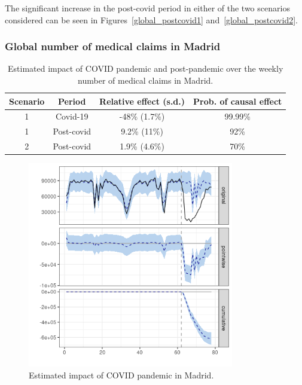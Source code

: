 \documentclass[9pt]{osa-supplemental-document}
\begin{document}
The significant increase in the post-covid period in either of the two scenarios considered can be seen in Figures~\ref{global_postcovid1} and~\ref{global_postcovid2}.

\subsubsection{Global number of medical claims in Madrid}\label{md}
\begin{table}[H]\caption{Estimated impact of COVID pandemic and post-pandemic over the weekly number of medical claims in Madrid.}
  \centering  
    \begin{tabular}{ |c|c|c|c| }
        \hline
     \textbf{Scenario} & \textbf{Period} & \textbf{Relative effect (s.d.)} & \textbf{Prob. of causal effect} \\ 
     \hline
     1 & Covid-19 & -48\% (1.7\%) & 99.99\% \\  
     1 & Post-covid & 9.2\% (11\%) & 92\% \\
     \hline   
     2 & Post-covid & 1.9\% (4.6\%) & 70\% \\
     \hline
    \end{tabular}
\end{table}

\begin{center}
    \begin{figure}[H]
      \includegraphics[width=9cm]{global_covid_Madrid.png}\caption{Estimated impact of COVID pandemic in Madrid.}
    \end{figure}
    \end{center}
    
\end{document}
